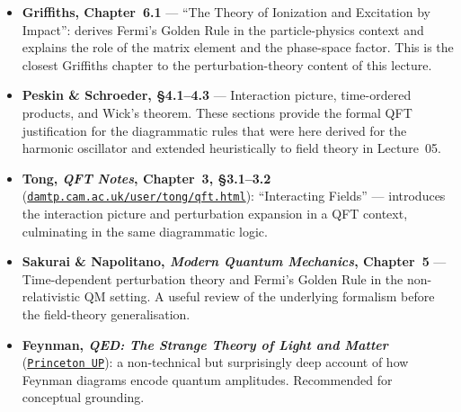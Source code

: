 \begin{itemize}
  \item \textbf{Griffiths, Chapter~6.1} — ``The Theory of Ionization and Excitation
    by Impact'': derives Fermi's Golden Rule in the particle-physics context and
    explains the role of the matrix element and the phase-space factor.  This is
    the closest Griffiths chapter to the perturbation-theory content of this
    lecture.

  \item \textbf{Peskin \& Schroeder, \S4.1--4.3} — Interaction picture, time-ordered
    products, and Wick's theorem.  These sections provide the formal QFT justification
    for the diagrammatic rules that were here derived for the harmonic oscillator and
    extended heuristically to field theory in Lecture~05.

  \item \textbf{Tong, \textit{QFT Notes}, Chapter~3, \S3.1--3.2}
    (\href{https://www.damtp.cam.ac.uk/user/tong/qft.html}{\texttt{damtp.cam.ac.uk/user/tong/qft.html}}):
    ``Interacting Fields'' — introduces the interaction picture and perturbation
    expansion in a QFT context, culminating in the same diagrammatic logic.

  \item \textbf{Sakurai \& Napolitano, \textit{Modern Quantum Mechanics}, Chapter~5}
    — Time-dependent perturbation theory and Fermi's Golden Rule in the
    non-relativistic QM setting.  A useful review of the underlying formalism
    before the field-theory generalisation.

  \item \textbf{Feynman, \textit{QED: The Strange Theory of Light and Matter}}
    (\href{https://press.princeton.edu/books/paperback/9780691164090/qed}{\texttt{Princeton UP}}):
    a non-technical but surprisingly deep account of how Feynman diagrams encode
    quantum amplitudes.  Recommended for conceptual grounding.
\end{itemize}
